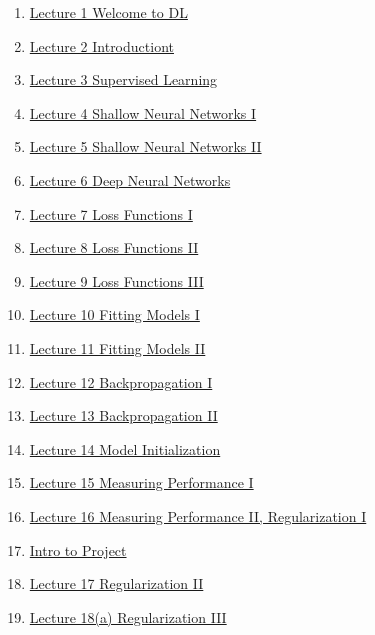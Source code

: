 \documentclass[11pt]{article}
\begin{document}
\begin{enumerate}
	\item  \href{https://mp.weixin.qq.com/s/VgAgeYBK-TPdCPiFz8piWQ}{Lecture 1 Welcome to DL} %
	\item  \href{https://mp.weixin.qq.com/s/I1ZkMHsHMpBmB2P-Wd-FDA}{Lecture 2 Introductiont} %
	\item  \href{https://mp.weixin.qq.com/s/WjN0zZfA0JRaGVL6bYN0qw}{Lecture 3 Supervised Learning} %
	\item  \href{https://mp.weixin.qq.com/s/s0kax_sE3qcJ81zXFi2XFg}{Lecture 4 Shallow Neural Networks I} %
	\item  \href{https://mp.weixin.qq.com/s/5fSP7aSGIWwuV_x1PZ0r_Q}{Lecture 5 Shallow Neural Networks II} %
	\item  \href{https://mp.weixin.qq.com/s/eyNmiR3Ixj1BZY75lhlqOA}{Lecture 6 Deep Neural Networks} %
	\item  \href{https://mp.weixin.qq.com/s/v6BTK-NhGhjMzk3p7Bm49g}{Lecture 7 Loss Functions I} %
	\item  \href{https://mp.weixin.qq.com/s/CgO7_amuSjGESD9KsklowQ}{Lecture 8 Loss Functions II} %
	\item  \href{https://mp.weixin.qq.com/s/DzKhDRGdnEGrG3b-uyB4FA}{Lecture 9 Loss Functions III} %
	\item  \href{https://mp.weixin.qq.com/s/Lo6HUyHxLJ4GyzGGtHy7xQ}{Lecture 10 Fitting Models I} %
	\item  \href{https://mp.weixin.qq.com/s/cJDOX9FwXXXsB81ish3JTA}{Lecture 11 Fitting Models II} %
	\item  \href{https://mp.weixin.qq.com/s/DEXYTY3YwBLKc7g82PBLsg}{Lecture 12 Backpropagation I} %
	\item  \href{https://mp.weixin.qq.com/s/Tuc6nGMaqjXV_ShEuP8p_w}{Lecture 13 Backpropagation II} %
	\item  \href{https://mp.weixin.qq.com/s/Xn7irlom3mgNRrj8TDzqag}{Lecture 14 Model Initialization} %
	\item  \href{https://mp.weixin.qq.com/s/rHOmr_-AIr9AXl9sAbiL7Q}{Lecture 15 Measuring Performance I} %
		\item  \href{https://mp.weixin.qq.com/s/XmoP7DDNilLe8ljawSjeXw}{Lecture 16 Measuring Performance II, Regularization I} %
	\item  \href{https://mp.weixin.qq.com/s/6k16yrFauulrpy_uz0xbIQ}{Intro to Project} %
	\item  \href{https://mp.weixin.qq.com/s/eDH5eEQasuUQtEOV4BS42w}{Lecture 17 Regularization II} %
	\item  \href{https://mp.weixin.qq.com/s/rqgu3qDoRbte3iRV3F26_Q}{Lecture 18(a) Regularization III} %

\end{enumerate}
\end{document}
